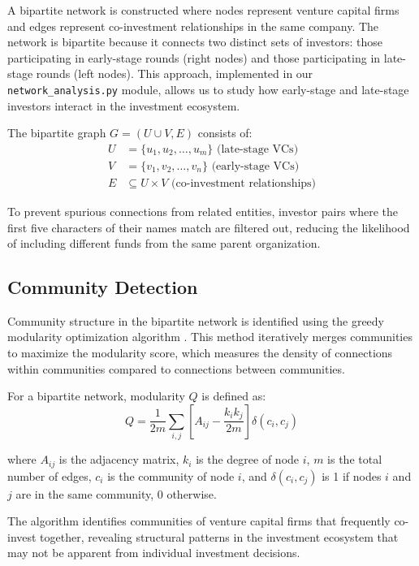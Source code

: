\documentclass[12pt]{article}
\begin{document}
A bipartite network is constructed where nodes represent venture capital firms and edges represent co-investment relationships in the same company. The network is bipartite because it connects two distinct sets of investors: those participating in early-stage rounds (right nodes) and those participating in late-stage rounds (left nodes). This approach, implemented in our \texttt{network\_analysis.py} module, allows us to study how early-stage and late-stage investors interact in the investment ecosystem.

The bipartite graph $G = (U \cup V, E)$ consists of:
\begin{align}
U &= \{u_1, u_2, \ldots, u_m\} \text{ (late-stage VCs)} \\
V &= \{v_1, v_2, \ldots, v_n\} \text{ (early-stage VCs)} \\
E &\subseteq U \times V \text{ (co-investment relationships)}
\end{align}

To prevent spurious connections from related entities, investor pairs where the first five characters of their names match are filtered out, reducing the likelihood of including different funds from the same parent organization.

\subsection{Community Detection}

Community structure in the bipartite network is identified using the greedy modularity optimization algorithm \cite{Borgatti2011}. This method iteratively merges communities to maximize the modularity score, which measures the density of connections within communities compared to connections between communities.

For a bipartite network, modularity $Q$ is defined as:
\begin{equation}
Q = \frac{1}{2m} \sum_{i,j} \left[ A_{ij} - \frac{k_i k_j}{2m} \right] \delta(c_i, c_j)
\end{equation}

where $A_{ij}$ is the adjacency matrix, $k_i$ is the degree of node $i$, $m$ is the total number of edges, $c_i$ is the community of node $i$, and $\delta(c_i, c_j)$ is 1 if nodes $i$ and $j$ are in the same community, 0 otherwise.

The algorithm identifies communities of venture capital firms that frequently co-invest together, revealing structural patterns in the investment ecosystem that may not be apparent from individual investment decisions.
\end{document}
